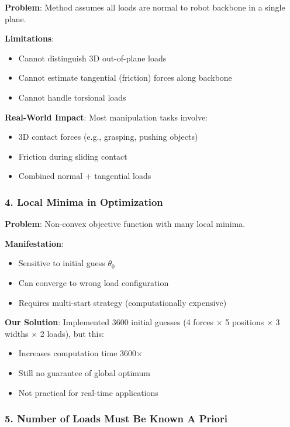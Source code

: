 \documentclass[11pt]{article}
\begin{document}
\textbf{Problem}: Method assumes all loads are normal to robot backbone in a single plane.

\textbf{Limitations}:
\begin{itemize}
    \item Cannot distinguish 3D out-of-plane loads
    \item Cannot estimate tangential (friction) forces along backbone
    \item Cannot handle torsional loads
\end{itemize}

\textbf{Real-World Impact}: Most manipulation tasks involve:
\begin{itemize}
    \item 3D contact forces (e.g., grasping, pushing objects)
    \item Friction during sliding contact
    \item Combined normal + tangential loads
\end{itemize}

\subsubsection{4. Local Minima in Optimization}

\textbf{Problem}: Non-convex objective function with many local minima.

\textbf{Manifestation}:
\begin{itemize}
    \item Sensitive to initial guess $\theta_0$
    \item Can converge to wrong load configuration
    \item Requires multi-start strategy (computationally expensive)
\end{itemize}

\textbf{Our Solution}: Implemented 3600 initial guesses (4 forces $\times$ 5 positions $\times$ 3 widths $\times$ 2 loads), but this:
\begin{itemize}
    \item Increases computation time 3600$\times$
    \item Still no guarantee of global optimum
    \item Not practical for real-time applications
\end{itemize}

\subsubsection{5. Number of Loads Must Be Known A Priori}
\end{document}
